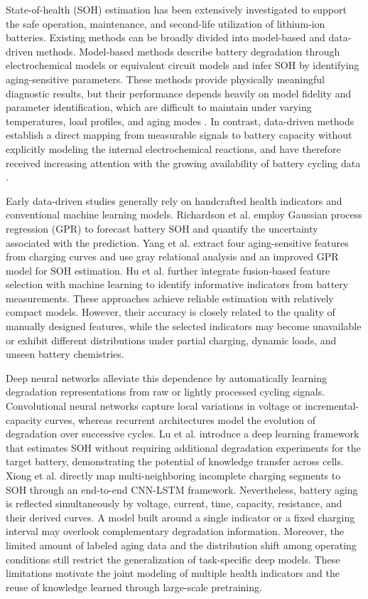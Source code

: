 \documentclass[preprint,12pt]{elsarticle}
\begin{document}
State-of-health (SOH) estimation has been extensively investigated to support the safe operation, maintenance, and second-life utilization of lithium-ion batteries. Existing methods can be broadly divided into model-based and data-driven methods. Model-based methods describe battery degradation through electrochemical models or equivalent circuit models and infer SOH by identifying aging-sensitive parameters. These methods provide physically meaningful diagnostic results, but their performance depends heavily on model fidelity and parameter identification, which are difficult to maintain under varying temperatures, load profiles, and aging modes \cite{han2019review,che2023health}. In contrast, data-driven methods establish a direct mapping from measurable signals to battery capacity without explicitly modeling the internal electrochemical reactions, and have therefore received increasing attention with the growing availability of battery cycling data \cite{li2019datadriven}.

Early data-driven studies generally rely on handcrafted health indicators and conventional machine learning models. Richardson et al. \cite{richardson2017gaussian} employ Gaussian process regression (GPR) to forecast battery SOH and quantify the uncertainty associated with the prediction. Yang et al. \cite{yang2018novel} extract four aging-sensitive features from charging curves and use gray relational analysis and an improved GPR model for SOH estimation. Hu et al. \cite{hu2020battery} further integrate fusion-based feature selection with machine learning to identify informative indicators from battery measurements. These approaches achieve reliable estimation with relatively compact models. However, their accuracy is closely related to the quality of manually designed features, while the selected indicators may become unavailable or exhibit different distributions under partial charging, dynamic loads, and unseen battery chemistries.

Deep neural networks alleviate this dependence by automatically learning degradation representations from raw or lightly processed cycling signals. Convolutional neural networks capture local variations in voltage or incremental-capacity curves, whereas recurrent architectures model the evolution of degradation over successive cycles. Lu et al. \cite{lu2023deep} introduce a deep learning framework that estimates SOH without requiring additional degradation experiments for the target battery, demonstrating the potential of knowledge transfer across cells. Xiong et al. \cite{xiong2024end} directly map multi-neighboring incomplete charging segments to SOH through an end-to-end CNN-LSTM framework. Nevertheless, battery aging is reflected simultaneously by voltage, current, time, capacity, resistance, and their derived curves. A model built around a single indicator or a fixed charging interval may overlook complementary degradation information. Moreover, the limited amount of labeled aging data and the distribution shift among operating conditions still restrict the generalization of task-specific deep models. These limitations motivate the joint modeling of multiple health indicators and the reuse of knowledge learned through large-scale pretraining.
\end{document}
